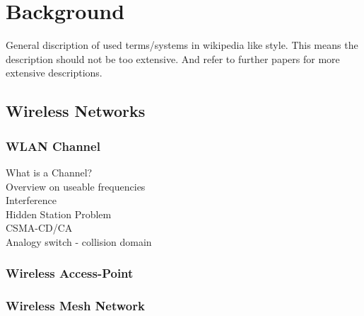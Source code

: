 \chapter{Background}
General discription of used terms/systems in wikipedia like style. This means the description should not be too extensive.
And refer to further papers for more extensive descriptions.
\section{Wireless Networks}
  \subsection{WLAN Channel}
    \begin{description}
    \item[What is a Channel?]
    \item[Overview on useable frequencies]
    \item[Interference]
    \item[Hidden Station Problem]
    \item[CSMA-CD/CA]
    \item[Analogy switch - collision domain]
    \end{description}
  \subsection{Wireless Access-Point}
  \subsection{Wireless Mesh Network}
    \cite{Akyildiz2005445}
    \cite{airberry}
